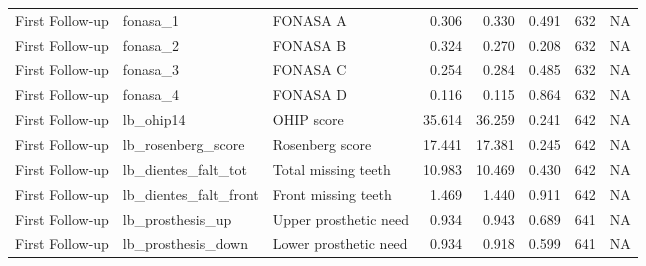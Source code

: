 \begin{table}
\begin{tabular}[t]{lllrrrrr}
First Follow-up & fonasa\_1 & FONASA A & 0.306 & 0.330 & 0.491 & 632 & NA\\
First Follow-up & fonasa\_2 & FONASA B & 0.324 & 0.270 & 0.208 & 632 & NA\\
First Follow-up & fonasa\_3 & FONASA C & 0.254 & 0.284 & 0.485 & 632 & NA\\
\addlinespace
First Follow-up & fonasa\_4 & FONASA D & 0.116 & 0.115 & 0.864 & 632 & NA\\
First Follow-up & lb\_ohip14 & OHIP score & 35.614 & 36.259 & 0.241 & 642 & NA\\
First Follow-up & lb\_rosenberg\_score & Rosenberg score & 17.441 & 17.381 & 0.245 & 642 & NA\\
First Follow-up & lb\_dientes\_falt\_tot & Total missing teeth & 10.983 & 10.469 & 0.430 & 642 & NA\\
First Follow-up & lb\_dientes\_falt\_front & Front missing teeth & 1.469 & 1.440 & 0.911 & 642 & NA\\
\addlinespace
First Follow-up & lb\_prosthesis\_up & Upper prosthetic need & 0.934 & 0.943 & 0.689 & 641 & NA\\
First Follow-up & lb\_prosthesis\_down & Lower prosthetic need & 0.934 & 0.918 & 0.599 & 641 & NA\\
\bottomrule
\end{tabular}
\end{table}
